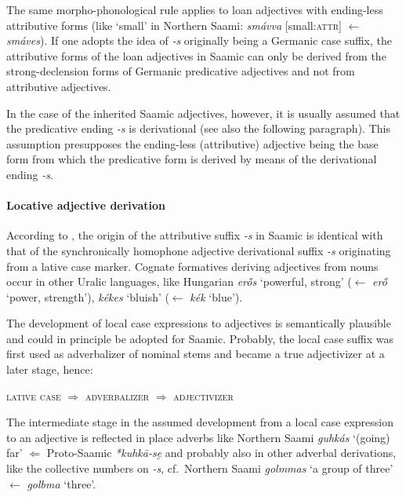 {The same morpho-phonological rule applies to loan adjectives with ending-less attributive forms (like ‘small’ in Northern Saami: \textit{smávva} [small:\textsc{attr}] $\leftarrow$ \textit{smáves}). If one adopts the idea of \textit{-s} originally being a Germanic case suffix, the attributive forms of the loan adjectives in Saamic can only be derived from the strong-declension forms of Germanic predicative adjectives and not from attributive adjectives.

In the case of the inherited Saamic adjectives, however, it is usually assumed that the predicative ending \textit{-s} is derivational (see also the following paragraph). This assumption presupposes the ending-less (attributive) adjective being the base form from which the predicative form is derived by means of the derivational ending \textit{-s}. %

\paragraph{Locative adjective derivation}
According to \citet[96]{bergsland1946}, the origin of the attributive suffix \textit{-s} in Saamic is identical with that of the synchronically homophone adjective derivational suffix \textit{-s} originating from a lative case marker. Cognate formatives deriving adjectives from nouns occur in other Uralic languages, like Hungarian \textit{erős} ‘powerful, strong’ ($\leftarrow$ \textit{erő} ‘power, strength’), \textit{kékes} ‘bluish’ ($\leftarrow$ \textit{kék} ‘blue’).

The development of local case expressions to adjectives is semantically plausible and could in principle be adopted for Saamic. Probably, the local case suffix was first used as adverbalizer of nominal stems and became a true adjectivizer at a later stage, hence:
\begin{exe}
\ex	\textsc{lative case} $\Rightarrow$ \textsc{adverbalizer} $\Rightarrow$ \textsc{adjectivizer}
\end{exe}
The intermediate stage in the assumed development from a local case expression to an adjective is reflected in place adverbs like Northern Saami \textit{guhkás} ‘(going) far’ $\Leftarrow$ Proto-Saamic \textit{*kuhkā-se̮} \cite[246]{sammallahti1998b} and probably also in other adverbal derivations, like the collective numbers on \textit{-s}, cf.~Northern Saami \textit{golmmas} ‘a group of three’ $\leftarrow$ \textit{golbma} ‘three’.

}
